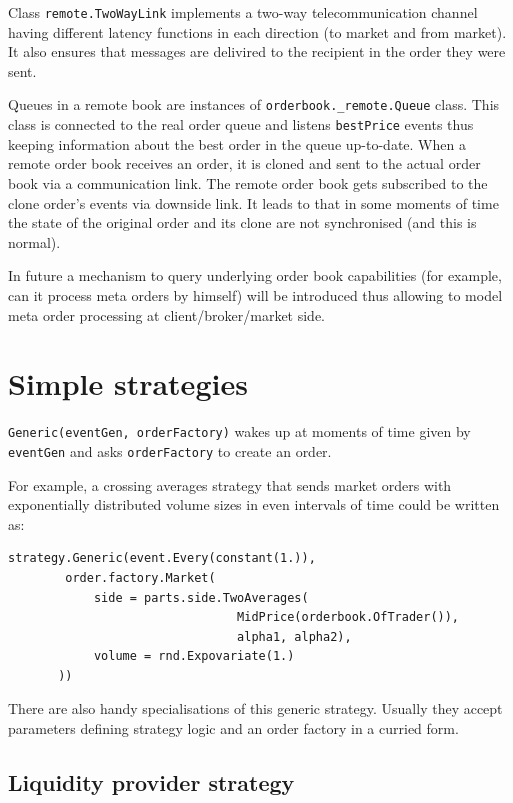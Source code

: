 \documentclass[a4paper,11pt]{article}
\begin{document}
Class \texttt{remote.TwoWayLink} implements a two-way telecommunication
channel having different latency functions in each direction (to market
and from market). It also ensures that messages are delivired to the
recipient in the order they were sent.

Queues in a remote book are instances of
\texttt{orderbook.\_remote.Queue} class. This class is connected to the
real order queue and listens \texttt{bestPrice} events thus keeping
information about the best order in the queue up-to-date. When a remote
order book receives an order, it is cloned and sent to the actual order
book via a communication link. The remote order book gets subscribed to
the clone order's events via downside link. It leads to that in some
moments of time the state of the original order and its clone are not
synchronised (and this is normal).

In future a mechanism to query underlying order book capabilities (for
example, can it process meta orders by himself) will be introduced thus
allowing to model meta order processing at client/broker/market side.

\section{Simple strategies}\label{simple-strategies}

\texttt{Generic(eventGen, orderFactory)} wakes up at moments of time
given by \texttt{eventGen} and asks \texttt{orderFactory} to create an
order.

For example, a crossing averages strategy that sends market orders with
exponentially distributed volume sizes in even intervals of time could
be written as:

\begin{verbatim}
strategy.Generic(event.Every(constant(1.)),
        order.factory.Market(
            side = parts.side.TwoAverages(
                                MidPrice(orderbook.OfTrader()),
                                alpha1, alpha2),
            volume = rnd.Expovariate(1.)
       ))
\end{verbatim}

There are also handy specialisations of this generic strategy. Usually
they accept parameters defining strategy logic and an order factory in a
curried form.

\subsection{Liquidity provider
strategy}\label{liquidity-provider-strategy}
\end{document}
